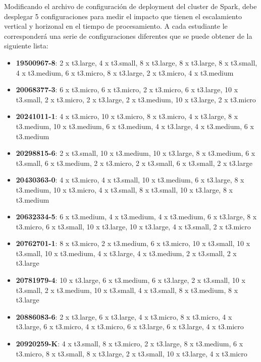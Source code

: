 \documentclass[12pt,letterpaper,twoside]{article}
\begin{document}
{\color{red} Modificando el archivo de configuración de deployment del cluster de Spark, debe desplegar 5 configuraciones para medir el impacto que tienen el escalamiento vertical y horizonal en el tiempo de procesamiento. A cada estudiante le corresponderá una serie de configuraciones diferentes que se puede obtener de la siguiente lista:

    \begin{itemize}
        \item \textbf{19500967-8}: 2 x t3.large, 4 x t3.small, 8 x t3.large, 8 x t3.large, 8 x t3.small, 4 x t3.medium, 6 x t3.micro, 8 x t3.large, 2 x t3.micro, 4 x t3.medium
        \item \textbf{20068377-3}: 6 x t3.micro, 6 x t3.micro, 2 x t3.micro, 6 x t3.large, 10 x t3.small, 2 x t3.micro, 2 x t3.large, 2 x t3.medium, 10 x t3.large, 2 x t3.micro
        \item \textbf{20241011-1}: 4 x t3.micro, 10 x t3.micro, 8 x t3.micro, 4 x t3.large, 8 x t3.medium, 10 x t3.medium, 6 x t3.medium, 4 x t3.large, 4 x t3.medium, 6 x t3.medium
        \item \textbf{20298815-6}: 2 x t3.small, 10 x t3.medium, 10 x t3.large, 8 x t3.medium, 6 x t3.small, 6 x t3.medium, 2 x t3.micro, 2 x t3.small, 6 x t3.small, 2 x t3.large
        \item \textbf{20430363-0}: 4 x t3.micro, 4 x t3.small, 10 x t3.medium, 6 x t3.large, 8 x t3.medium, 10 x t3.micro, 4 x t3.small, 8 x t3.small, 10 x t3.large, 8 x t3.medium
        \item \textbf{20632334-5}: 6 x t3.medium, 4 x t3.medium, 4 x t3.medium, 6 x t3.large, 8 x t3.micro, 6 x t3.small, 10 x t3.large, 10 x t3.large, 4 x t3.small, 2 x t3.micro
        \item \textbf{20762701-1}: 8 x t3.micro, 2 x t3.medium, 6 x t3.micro, 10 x t3.small, 10 x t3.small, 10 x t3.medium, 4 x t3.large, 4 x t3.medium, 2 x t3.small, 2 x t3.large
        \item \textbf{20781979-4}: 10 x t3.large, 6 x t3.medium, 6 x t3.large, 2 x t3.small, 10 x t3.small, 2 x t3.medium, 10 x t3.small, 4 x t3.small, 8 x t3.medium, 8 x t3.large
        \item \textbf{20886083-6}: 2 x t3.large, 6 x t3.large, 4 x t3.micro, 8 x t3.micro, 4 x t3.large, 6 x t3.micro, 4 x t3.micro, 6 x t3.large, 6 x t3.large, 4 x t3.micro
        \item \textbf{20920259-K}: 4 x t3.small, 8 x t3.micro, 2 x t3.large, 8 x t3.medium, 6 x t3.micro, 8 x t3.small, 8 x t3.large, 2 x t3.small, 10 x t3.large, 4 x t3.micro

\end{itemize}}
\end{document}
